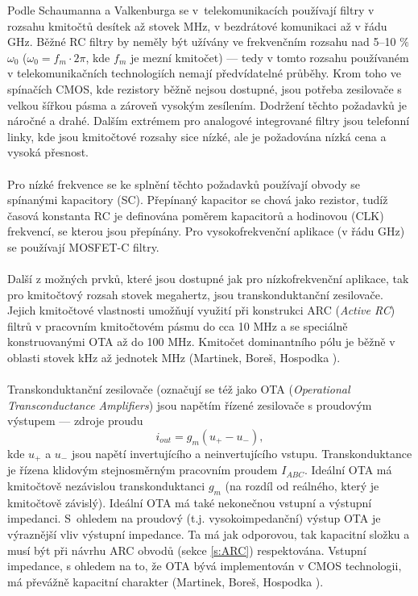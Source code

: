 Podle Schaumanna a Valkenburga \cite{13} se v~telekomunikacích používají filtry v rozsahu kmitočtů desítek až stovek MHz, v bezdrátové komunikaci až v řádu GHz. Běžné RC filtry by neměly být užívány ve frekvenčním rozsahu nad 5--10 $\%$ $\omega _0$ ($\omega _0 = f_m \cdot 2 \pi$, kde $f_m$ je mezní kmitočet) --- tedy v tomto rozsahu používaném v telekomunikačních technologiích nemají předvídatelné průběhy. Krom toho ve spínačích CMOS, kde rezistory běžně nejsou dostupné, jsou potřeba zesilovače s velkou šířkou pásma a zároveň vysokým zesílením. Dodržení těchto požadavků je náročné a drahé. Dalším extrémem pro analogové integrované filtry jsou telefonní linky, kde jsou kmitočtové rozsahy sice nízké, ale je požadována nízká cena a vysoká přesnost.\\
\\
Pro nízké frekvence se ke splnění těchto požadavků používají obvody se spínanými kapacitory (SC). Přepínaný kapacitor se chová jako rezistor, tudíž časová konstanta RC je definována poměrem kapacitorů a hodinovou (CLK) frekvencí, se kterou jsou přepínány. Pro vysokofrekvenční aplikace (v řádu GHz) se používají \newline MOSFET-C filtry.\\
\\
Další z možných prvků, které jsou dostupné jak pro nízkofrekvenční aplikace, tak pro kmitočtový rozsah stovek megahertz, jsou transkonduktanční zesilovače. Jejich kmitočtové vlastnosti umožňují využití při konstrukci ARC (\textit{Active RC}) filtrů v pracovním kmitočtovém pásmu do cca 10 MHz a se speciálně konstruovanými OTA až do 100 MHz. Kmitočet dominantního pólu je běžně v oblasti stovek kHz až jednotek MHz (Martinek, Boreš, Hospodka \cite{12}).\\
\\
Transkonduktanční zesilovače (označují se též jako OTA (\textit{Operational Transconductance Amplifiers}) jsou napětím řízené zesilovače s proudovým výstupem --- zdroje proudu
\begin{equation}
i_{out} = g_m(u_+ - u_-),
\end{equation}
kde $u_+$ a $u_-$ jsou napětí invertujícího a neinvertujícího vstupu. Transkonduktance je řízena klidovým stejnosměrným pracovním proudem $I_{ABC}$. Ideální OTA má kmitočtově nezávislou transkonduktanci $g_m$ (na rozdíl od reálného, který je kmitočtově závislý). Ideální OTA má také nekonečnou vstupní a výstupní impedanci. S~ohledem na proudový (t.j. vysokoimpedanční) výstup OTA je výraznější vliv výstupní impedance. Ta má jak odporovou, tak kapacitní složku a musí být při návrhu ARC obvodů (sekce \ref{s:ARC}) respektována. Vstupní impedance, s ohledem na to, že OTA bývá implementován v CMOS technologii, má převážně kapacitní charakter (Martinek, Boreš, Hospodka \cite{12}).
